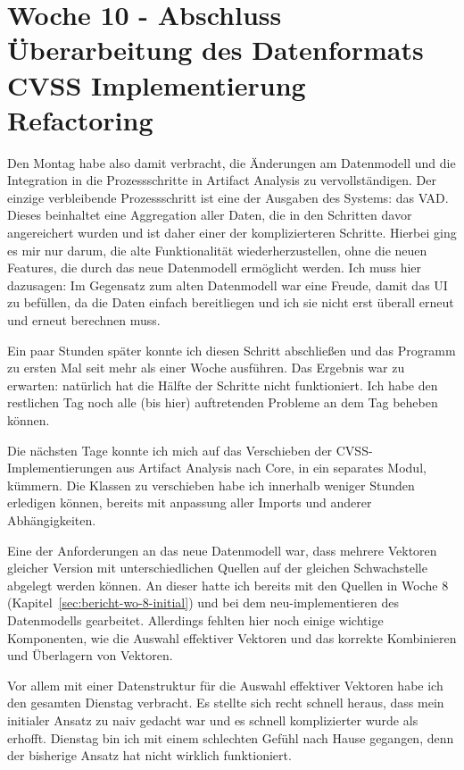 \section{Woche 10 - Abschluss Überarbeitung des Datenformats \headerand CVSS Implementierung Refactoring} \label{sec:bericht-wo-10-initial}


\lweekdaymarginpar{\weekdayMondayLong}

Den Montag habe also damit verbracht, die Änderungen am Datenmodell und die Integration in die Prozessschritte in Artifact Analysis zu vervollständigen.
Der einzige verbleibende Prozessschritt ist eine der Ausgaben des Systems: das VAD\@.
Dieses beinhaltet eine Aggregation aller Daten, die in den Schritten davor angereichert wurden und ist daher einer der komplizierteren Schritte.
Hierbei ging es mir nur darum, die alte Funktionalität wiederherzustellen, ohne die neuen Features, die durch das neue Datenmodell ermöglicht werden.
Ich muss hier dazusagen: Im Gegensatz zum alten Datenmodell war eine Freude, damit das UI zu befüllen, da die Daten einfach bereitliegen und ich sie nicht erst überall erneut und erneut berechnen muss.

Ein paar Stunden später konnte ich diesen Schritt abschließen und das Programm zu ersten Mal seit mehr als einer Woche ausführen.
Das Ergebnis war zu erwarten: natürlich hat die Hälfte der Schritte nicht funktioniert.
Ich habe den restlichen Tag noch alle (bis hier) auftretenden Probleme an dem Tag beheben können.

\sweekdaymarginpar{\weekdayTuesdayLong}

Die nächsten Tage konnte ich mich auf das Verschieben der CVSS-Implementierungen aus Artifact Analysis nach Core, in ein separates Modul, kümmern.
Die Klassen zu verschieben habe ich innerhalb weniger Stunden erledigen können, bereits mit anpassung aller Imports und anderer Abhängigkeiten.

Eine der Anforderungen an das neue Datenmodell war, dass mehrere Vektoren gleicher Version mit unterschiedlichen Quellen auf der gleichen Schwachstelle abgelegt werden können.
An dieser hatte ich bereits mit den Quellen in Woche 8 (Kapitel\ \ref{sec:bericht-wo-8-initial}) und bei dem neu-implementieren des Datenmodells gearbeitet.
Allerdings fehlten hier noch einige wichtige Komponenten, wie die Auswahl effektiver Vektoren und das korrekte Kombinieren und Überlagern von Vektoren.

Vor allem mit einer Datenstruktur für die Auswahl effektiver Vektoren habe ich den gesamten Dienstag verbracht.
Es stellte sich recht schnell heraus, dass mein initialer Ansatz zu naiv gedacht war und es schnell komplizierter wurde als erhofft.
Dienstag bin ich mit einem schlechten Gefühl nach Hause gegangen, denn der bisherige Ansatz hat nicht wirklich funktioniert.

